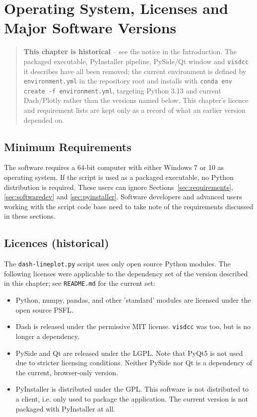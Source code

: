 \chapter{Operating System, Licenses and Major Software Versions}

\begin{quotation}
\noindent\textbf{This chapter is historical} -- see the notice in the
Introduction. The packaged executable, PyInstaller pipeline, PySide/Qt
window and \texttt{visdcc} it describes have all been removed; the current
environment is defined by \texttt{environment.yml} in the repository root
and installs with \texttt{conda env create -f environment.yml}, targeting
Python 3.13 and current Dash/Plotly rather than the versions named below.
This chapter's licence and requirement lists are kept only as a record of
what an earlier version depended on.
\end{quotation}

\section{Minimum Requirements}
\label{sec:minReq}

The software requires a 64-bit computer with either Windows 7 or 10 as operating system. If the script is used as a packaged executable, no Python distribution is required. These users can ignore Sections~\ref{sec:requirements},  \ref{sec:softwaredev} and \ref{sec:pyinstaller}.
Software developers and advanced users working with the script code base need to take note of the requirements discussed in these sections.


\section{Licences (historical)}
\label{sec:licenses}

The \texttt{dash-lineplot.py} script uses only open source Python modules. The following licenses were applicable to the dependency set of the version described in this chapter; see \texttt{README.md} for the current set:

\begin{itemize}

  \item Python, numpy, pandas, and other 'standard' modules are licensed under the open source \ac{PSFL}.
  \item Dash is released under the permissive \ac{MIT} license. \texttt{visdcc} was too, but is no longer a dependency.
  \item PySide and Qt are released under the \ac{LGPL}. Note that PyQt5 is not used due to stricter licensing conditions. Neither PySide nor Qt is a dependency of the current, browser-only version.
  \item PyInstaller is distributed under the \ac{GPL}. This software is not distributed to a client, i.e. only used to package the application. The current version is not packaged with PyInstaller at all.
\end{itemize}

